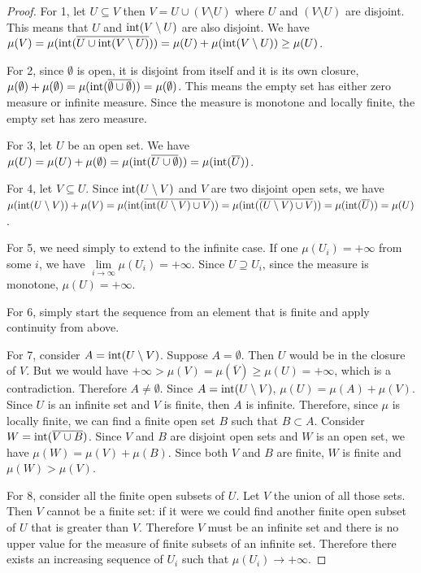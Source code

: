 \begin{mathSection}
\begin{proof}
	For 1, let $U \subseteq V$ then $V = U \cup (V \setminus U)$ where $U$ and $(V \setminus U)$ are disjoint. This means that $U$ and $\operatorname{int}(V \setminus U)$ are also disjoint. We have $\mu(V) = \mu(\operatorname{int}(\overline{U \cup \operatorname{int}(V \setminus U)})) = \mu(U) + \mu(\operatorname{int}(V \setminus U)) \geq \mu(U)$.
	
	For 2, since $\emptyset$ is open, it is disjoint from itself and it is its own closure, $\mu(\emptyset) + \mu(\emptyset) = \mu(\operatorname{int}(\overline{\emptyset\cup\emptyset}))= \mu(\emptyset)$. This means the empty set has either zero measure or infinite measure. Since the measure is monotone and locally finite, the empty set has zero measure.
	
	For 3, let $U$ be an open set. We have $\mu(U) = \mu(U) + \mu(\emptyset) = \mu(\operatorname{int}(\overline{U\cup\emptyset}))= \mu(\operatorname{int}(\overline{U}))$.
	
	For 4, let $V \subseteq U$. Since $\operatorname{int}(U \setminus V)$ and $V$ are two disjoint open sets, we have $\mu(\operatorname{int}(U \setminus V)) + \mu(V) = \mu(\operatorname{int}(\overline{\operatorname{int}(U \setminus V)\cup V}))=\mu(\operatorname{int}(\overline{(U \setminus V)\cup V}))=\mu(\operatorname{int}(\overline{U}))=\mu(U)$.
	
	For 5, we need simply to extend to the infinite case. If one $\mu(U_i) = + \infty$ from some $i$, we have $\lim\limits_{i \to \infty}\mu(U_i) = +\infty$. Since $U \supseteq U_i$, since the measure is monotone, $\mu(U) = +\infty$.
	
	For 6, simply start the sequence from an element that is finite and apply continuity from above.
	
	For 7, consider $A = \operatorname{int}(U \setminus V)$. Suppose $A = \emptyset$. Then $U$ would be in the closure of $V$. But we would have $+ \infty > \mu(V) = \mu(\overline{V}) \geq \mu(U) = +\infty$, which is a contradiction. Therefore $A \neq \emptyset$. Since $A = \operatorname{int}(U \setminus V)$, $\mu(U) = \mu(A) + \mu(V)$. Since $U$ is an infinite set and $V$ is finite, then $A$ is infinite. Therefore, since $\mu$ is locally finite, we can find a finite open set $B$ such that $B \subset A$. Consider $W = \operatorname{int}(\overline{V \cup B})$. Since $V$ and $B$ are disjoint open sets and $W$ is an open set, we have $\mu(W) = \mu(V) + \mu(B)$. Since both $V$ and $B$ are finite, $W$ is finite and $\mu(W) > \mu(V)$.
	
	For 8, consider all the finite open subsets of $U$. Let $V$ the union of all those sets. Then $V$ cannot be a finite set: if it were we could find another finite open subset of $U$ that is greater than $V$. Therefore $V$ must be an infinite set and there is no upper value for the measure of finite subsets of an infinite set. Therefore there exists an increasing sequence of $U_i$ such that $\mu(U_i) \to +\infty$.
\end{proof}


\end{mathSection}
